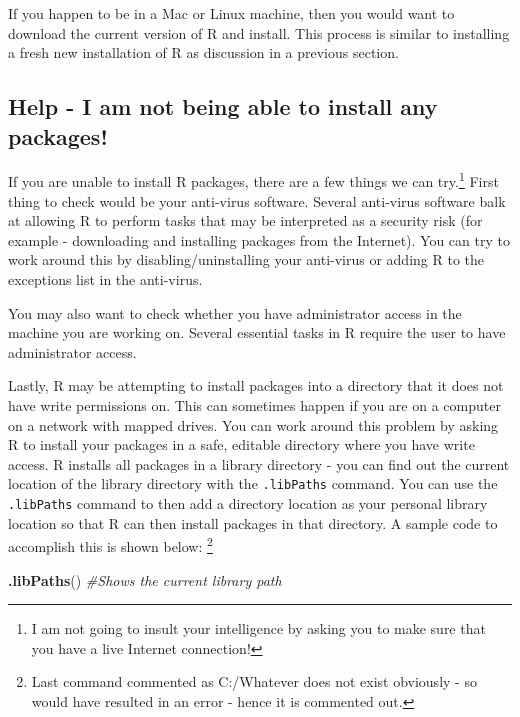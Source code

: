 \documentclass[]{krantz}
\makeatletter
\newenvironment{Shaded}{\begin{snugshade}}{\end{snugshade}}
\newcommand{\KeywordTok}[1]{\textcolor[rgb]{0.27,0.27,0.27}{\textbf{#1}}}
\newcommand{\CommentTok}[1]{\textcolor[rgb]{0.56,0.35,0.01}{\textit{#1}}}
\newcommand{\NormalTok}[1]{#1}
\newenvironment{kframe}{%
\medskip{}
\setlength{\fboxsep}{.8em}
 \def\at@end@of@kframe{}%
 \ifinner\ifhmode%
  \def\at@end@of@kframe{\end{minipage}}%
  \begin{minipage}{\columnwidth}%
 \fi\fi%
 \def\FrameCommand##1{\hskip\@totalleftmargin \hskip-\fboxsep
 \colorbox{shadecolor}{##1}\hskip-\fboxsep
     \hskip-\linewidth \hskip-\@totalleftmargin \hskip\columnwidth}%
 \MakeFramed {\advance\hsize-\width
   \@totalleftmargin\z@ \linewidth\hsize
   \@setminipage}}%
 {\par\unskip\endMakeFramed%
 \at@end@of@kframe}
\renewenvironment{Shaded}{\begin{kframe}}{\end{kframe}}
\theoremstyle{definition}
\theoremstyle{definition}
\theoremstyle{definition}
\theoremstyle{remark}
\makeatother
\begin{document}
If you happen to be in a Mac or Linux machine, then you would want to
download the current version of R and install. This process is similar
to installing a fresh new installation of R as discussion in a previous
section.

\subsection{Help - I am not being able to install any
packages!}\label{help---i-am-not-being-able-to-install-any-packages}

If you are unable to install R packages, there are a few things we can
try.\footnote{I am not going to insult your intelligence by asking you
  to make sure that you have a live Internet connection!} First thing to
check would be your anti-virus software. Several anti-virus software
balk at allowing R to perform tasks that may be interpreted as a
security risk (for example - downloading and installing packages from
the Internet). You can try to work around this by disabling/uninstalling
your anti-virus or adding R to the exceptions list in the anti-virus.

You may also want to check whether you have administrator access in the
machine you are working on. Several essential tasks in R require the
user to have administrator access.

Lastly, R may be attempting to install packages into a directory that it
does not have write permissions on. This can sometimes happen if you are
on a computer on a network with mapped drives. You can work around this
problem by asking R to install your packages in a safe, editable
directory where you have write access. R installs all packages in a
library directory - you can find out the current location of the library
directory with the \texttt{.libPaths} command. You can use the
\texttt{.libPaths} command to then add a directory location as your
personal library location so that R can then install packages in that
directory. A sample code to accomplish this is shown below: \footnote{Last
  command commented as C:/Whatever does not exist obviously - so would
  have resulted in an error - hence it is commented out.}

\begin{Shaded}
\begin{Highlighting}[]
\KeywordTok{.libPaths}\NormalTok{() }\CommentTok{#Shows the current library path}
\end{Highlighting}
\end{Shaded}
\end{document}
